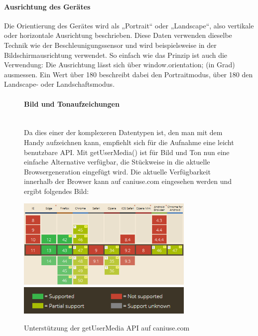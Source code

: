 \documentclass[a4paper]{spie}  %
\begin{document}
\paragraph{Ausrichtung des Gerätes}
Die Orientierung des Gerätes wird als „Portrait“ oder „Landscape“, also vertikale oder horizontale Ausrichtung beschrieben. Diese Daten verwenden dieselbe Technik wie der Beschleunigungssensor und wird beispielsweise in der Bildschirmausrichtung verwendet. So einfach wie das Prinzip ist auch die Verwendung: Die Ausrichtung lässt sich über window.orientation; (in Grad) ausmessen. Ein Wert über 180 beschreibt dabei den Portraitmodus, über 180 den Landscape- oder Landschaftsmodus.


\begin{figure}[H]
\begin{minipage}[t]{0.4\textwidth}
\vspace{0pt}
\paragraph{Bild und Tonaufzeichungen}\mbox{}\\
Da dies einer der komplexeren Datentypen ist, den man mit dem Handy aufzeichnen kann, empfiehlt sich für die Aufnahme eine leicht benutzbare API. Mit getUserMedia() ist für Bild und Ton nun eine einfache Alternative verfügbar, die Stückweise in die aktuelle Browsergeneration eingefügt wird. Die aktuelle Verfügbarkeit innerhalb der Browser kann auf caniuse.com eingesehen werden und ergibt folgendes Bild:

\end{minipage}
\hfill
\begin{minipage}[t]{0.5\textwidth}
\vspace{0pt}
    \includegraphics[width=8.5cm]{images/caniuseGetUserMedia}
    \centering
    \vspace{10 mm}
    \includegraphics[width=8.5cm]{images/legende}
    \caption{Unterstützung der getUserMedia API auf caniuse.com}
	\label{fig:test2}
\end{minipage}
\end{figure}
\end{document}
